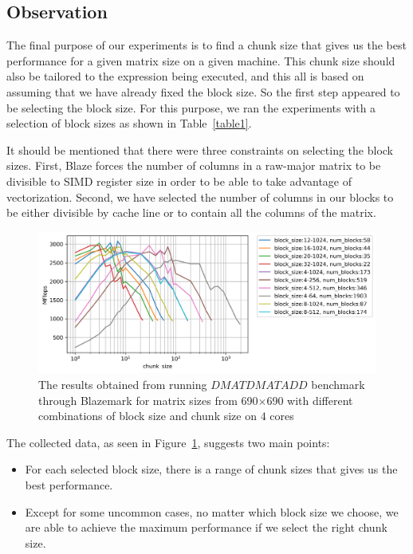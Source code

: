 \vspace{\baselineskip}	
\subsection{Observation}
The final purpose of our experiments is to find a chunk size that gives us the best performance for a given matrix size on a given machine. This chunk size should also be tailored to the expression being executed, and this all is based on assuming that we have already fixed the block size.
So the first step appeared to be selecting the block size. For this purpose, we ran the experiments with a selection of block sizes as shown in Table~\ref{table1}.


It should be mentioned that there were three constraints on selecting the block sizes. First, Blaze forces the number of columns in a raw-major matrix to be divisible to SIMD register size in order to be able to take advantage of vectorization. Second, we have selected the number of columns in our blocks to be either divisible by cache line or to contain all the columns of the matrix.     


\begin{figure}[H]
	\centering
	\includegraphics[width=1\linewidth]{images/fig5.png}
	\caption{The results obtained from running $DMATDMATADD$ benchmark through Blazemark for matrix sizes from 690$\times$690 with different combinations of block size and chunk size on $4$ cores}	
	\label{fig5}
\end{figure}

The collected data, as seen in Figure~\ref{fig5}, suggests two main points:
\begin{itemize}
	\item For each selected block size, there is a range of chunk sizes that gives us the best performance. 
	\item Except for some uncommon cases, no matter which block size we choose, we are able to achieve the maximum performance if we select the right chunk size.  
\end{itemize}

